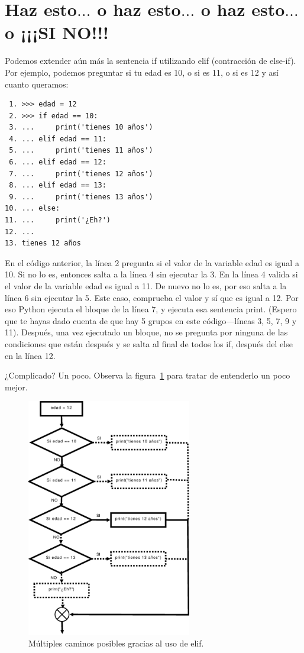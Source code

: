 \section{Haz esto$\ldots$ o haz esto$\ldots$ o haz esto$\ldots$ o ¡¡¡SI NO!!!}

Podemos extender aún más la sentencia if utilizando elif (contracción de else-if).  Por ejemplo, podemos preguntar si tu edad es 10, o si es 11, o si es 12 y así cuanto queramos: 

\begin{listing}
\begin{verbatim}
 1. >>> edad = 12
 2. >>> if edad == 10:
 3. ...     print('tienes 10 años')
 4. ... elif edad == 11:
 5. ...     print('tienes 11 años')
 6. ... elif edad == 12:
 7. ...     print('tienes 12 años')
 8. ... elif edad == 13:
 9. ...     print('tienes 13 años')
10. ... else:
11. ...     print('¿Eh?')
12. ...
13. tienes 12 años
\end{verbatim}
\end{listing}

En el código anterior, la línea 2 pregunta si el valor de la variable edad es igual a 10.  Si no lo es, entonces salta a la línea 4 sin ejecutar la 3. En la línea 4 valida si el valor de la variable edad es igual a 11. De nuevo no lo es, por eso salta a la línea 6 sin ejecutar la 5.  Este caso, comprueba el valor y sí que es igual a 12.  Por eso Python ejecuta el bloque de la línea 7, y ejecuta esa sentencia print.  (Espero que te hayas dado cuenta de que hay 5 grupos en este código---líneas 3, 5, 7, 9 y 11).  Después, una vez ejecutado un bloque, no se pregunta por ninguna de las condiciones que están después y se salta al final de todos los if, después del else en la línea 12.

¿Complicado? Un poco. Observa la figura~\ref{if7} para tratar de entenderlo un poco mejor.

\begin{figure}
\begin{center}
\includegraphics[width=72mm]{if7.eps}
\end{center}
\caption{Múltiples caminos posibles gracias al uso de elif.}\label{if7}
\end{figure}

